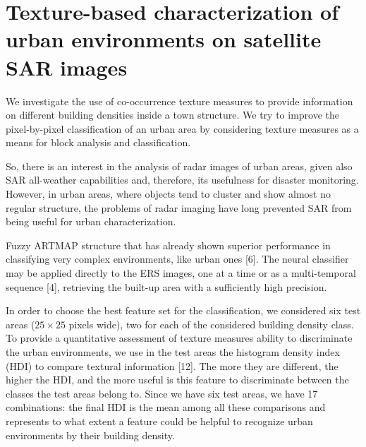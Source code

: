 \documentclass[paper=a4, fontsize=11pt]{scrartcl}
\begin{document}
\newpage

\section*{\textcolor{VioletRed4}{Texture-based characterization of urban environments on satellite SAR images}}

We investigate the use of co-occurrence texture measures to provide information on different building densities inside a town structure. 
We try to improve the pixel-by-pixel classification of an urban area by considering texture measures as a means for block analysis and classification.

So, there is an interest in the analysis of radar images of urban areas, given also SAR all-weather capabilities and, therefore, its usefulness for disaster monitoring. 
However, in urban areas, where objects tend to cluster and show almost no regular structure, the problems of radar imaging have long prevented SAR from being useful for urban characterization.

Fuzzy ARTMAP structure that has already shown superior performance in classifying very complex environments, like urban ones [6]. 
The neural classifier may be applied directly to the ERS images, one at a time or as a multi-temporal sequence [4], retrieving the built-up area with a sufficiently high precision.

In order to choose the best feature set for the classification, we considered six test areas ($25 \times 25$ pixels wide), two for each of the considered building density class. 
To provide a quantitative assessment of texture measures ability to discriminate the urban environments, we use in the test areas the histogram density index (HDI) to compare textural information [12].
The more they are different, the higher the HDI, and the more useful is this feature to discriminate between the classes the test areas belong to. 
Since we have six test areas, we have 17 combinations: the final HDI is the mean among all these comparisons and represents to what extent a feature could be helpful to recognize urban environments by their building density.
\end{document}
